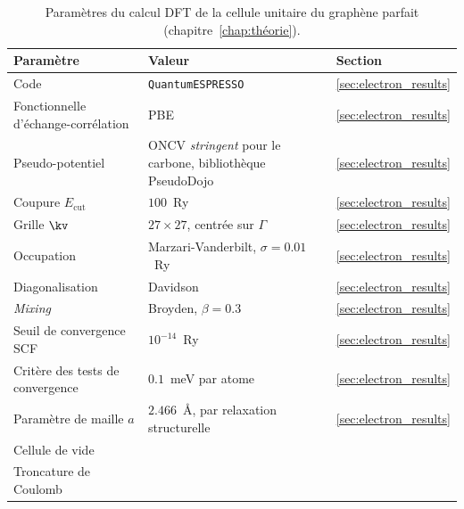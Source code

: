 \begin{table}[htbp]
    \centering
    \caption[Paramètres du calcul DFT de la cellule unitaire.]{Paramètres du calcul DFT de la cellule unitaire du graphène parfait (chapitre~\ref{chap:théorie}).}
    \label{tab:param_dft}
    \small
    \setlength{\tabcolsep}{4pt}
    \begin{tabular}{p{} p{} p{}}
        \hline\hline
        Paramètre & Valeur & Section \\
        \hline
        Code & \texttt{QuantumESPRESSO} & \ref{sec:electron_results} \\
        Fonctionnelle d'échange-corrélation & PBE & \ref{sec:electron_results} \\
        Pseudo-potentiel & ONCV \textit{stringent} pour le carbone, bibliothèque PseudoDojo & \ref{sec:electron_results} \\
        Coupure $E_\text{cut}$ & $100$~Ry & \ref{sec:electron_results} \\
        Grille $\kv$ & $27\times 27$, centrée sur $\Gamma$ & \ref{sec:electron_results} \\
        Occupation & Marzari-Vanderbilt, $\sigma = 0.01$~Ry & \ref{sec:electron_results} \\
        Diagonalisation & Davidson & \ref{sec:electron_results} \\
        \textit{Mixing} & Broyden, $\beta = 0.3$ & \ref{sec:electron_results} \\
        Seuil de convergence SCF & $10^{-14}$~Ry & \ref{sec:electron_results} \\
        Critère des tests de convergence & $0.1$~meV par atome & \ref{sec:electron_results} \\
        Paramètre de maille $a$ & $2.466$~\AA{}, par relaxation structurelle & \ref{sec:electron_results} \\
        Cellule de vide & & \\
        Troncature de Coulomb & & \\
        \hline\hline
    \end{tabular}
\end{table}

